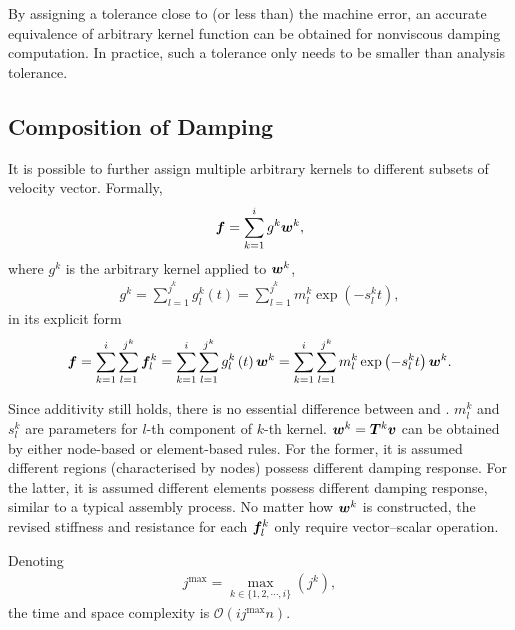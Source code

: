 By assigning a tolerance close to (or less than) the machine error, an accurate equivalence of arbitrary kernel function can be obtained for nonviscous damping computation. In practice, such a tolerance only needs to be smaller than analysis tolerance.
\subsection{Composition of Damping}
It is possible to further assign multiple arbitrary kernels to different subsets of velocity vector. Formally,
\begin{gather}
\bm{f}=\sum_{k=1}^{i}g^k\bm{w}^k,
\end{gather}
where $g^k$ is the arbitrary kernel applied to $\bm{w}^k$,
\begin{gather}
g^k=\sum_{l=1}^{j^k}g_l^k\left(t\right)=\sum_{l=1}^{j^k}m_l^k\exp\left(-s_l^kt\right),
\end{gather}
in its explicit form
\begin{gather}\label{eq:composition}
\bm{f}=\sum_{k=1}^{i}\sum_{l=1}^{j^k}\bm{f}_l^k=\sum_{k=1}^{i}\sum_{l=1}^{j^k}g_l^k\left(t\right)\bm{w}^k=\sum_{k=1}^{i}\sum_{l=1}^{j^k}m_l^k\exp\left(-s_l^kt\right)\bm{w}^k.
\end{gather}

Since additivity still holds, there is no essential difference between  and . $m_l^k$ and $s_l^k$ are parameters for $l$-th component of $k$-th kernel. $\bm{w}^k=\bm{T}^k\bm{v}$ can be obtained by either node-based or element-based rules. For the former, it is assumed different regions (characterised by nodes) possess different damping response. For the latter, it is assumed different elements possess different damping response, similar to a typical assembly process. No matter how $\bm{w}^k$ is constructed, the revised stiffness and resistance for each $\bm{f}_l^k$ only require vector--scalar operation.

Denoting
\begin{gather}
j^\text{max}=\max_{k\in\{1,2,\cdots,i\}}\left(j^k\right),
\end{gather}
the time and space complexity is $\mathcal{O}\left(ij^\text{max}n\right)$.
